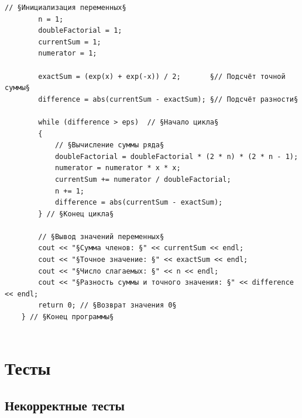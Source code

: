 \documentclass[a4paper]{article}
\begin{document}
\begin{lstlisting}[style={CppCodeStyle}]
		// §Инициализация переменных§
		n = 1;
		doubleFactorial = 1;
		currentSum = 1;
		numerator = 1;
		
		exactSum = (exp(x) + exp(-x)) / 2;       §// Подсчёт точной суммы§
		difference = abs(currentSum - exactSum); §// Подсчёт разности§
		
		while (difference > eps)  // §Начало цикла§
		{
			// §Вычисление суммы ряда§
			doubleFactorial = doubleFactorial * (2 * n) * (2 * n - 1);
			numerator = numerator * x * x;
			currentSum += numerator / doubleFactorial;
			n += 1;
			difference = abs(currentSum - exactSum);
		} // §Конец цикла§
		
		// §Вывод значений переменных§
		cout << "§Сумма членов: §" << currentSum << endl;
		cout << "§Точное значение: §" << exactSum << endl;
		cout << "§Число слагаемых: §" << n << endl;
		cout << "§Разность суммы и точного значения: §" << difference << endl;
		return 0; // §Возврат значения 0§
	} // §Конец программы§
	
	\end{lstlisting}
	
	\section{Тесты}
	\subsection{Некорректные тесты}
	
\end{document}
